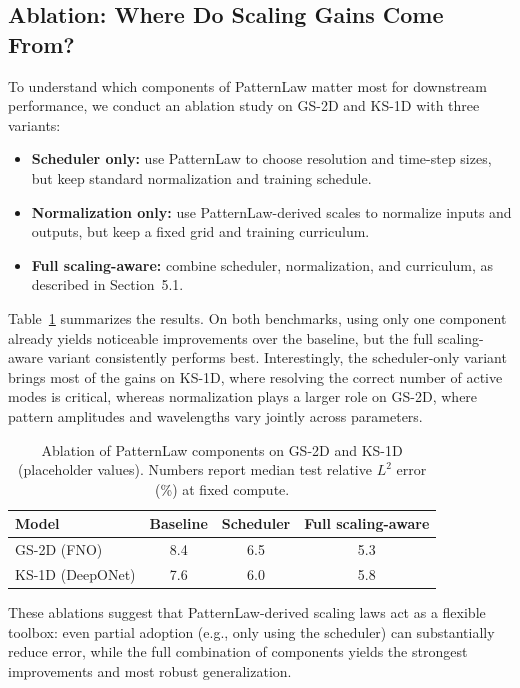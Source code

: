 \documentclass{article}
\theoremstyle{plain}
\theoremstyle{definition}
\theoremstyle{remark}
\begin{document}
\subsection{Ablation: Where Do Scaling Gains Come From?}

To understand which components of PatternLaw matter most for downstream performance, we conduct an ablation study on GS-2D and KS-1D with three variants:

\begin{itemize}
    \item \textbf{Scheduler only:} use PatternLaw to choose resolution and time-step sizes, but keep standard normalization and training schedule.
    \item \textbf{Normalization only:} use PatternLaw-derived scales to normalize inputs and outputs, but keep a fixed grid and training curriculum.
    \item \textbf{Full scaling-aware:} combine scheduler, normalization, and curriculum, as described in Section~5.1.
\end{itemize}

Table~\ref{tab:ablation_scaling} summarizes the results. On both benchmarks, using only one component already yields noticeable improvements over the baseline, but the full scaling-aware variant consistently performs best. Interestingly, the scheduler-only variant brings most of the gains on KS-1D, where resolving the correct number of active modes is critical, whereas normalization plays a larger role on GS-2D, where pattern amplitudes and wavelengths vary jointly across parameters.

\begin{table}[t]
    \centering
    \caption{Ablation of PatternLaw components on GS-2D and KS-1D (placeholder values). Numbers report median test relative $L^2$ error (\%) at fixed compute.}
    \label{tab:ablation_scaling}
    \begin{tabular}{lccc}
        \toprule
        Model & Baseline & Scheduler & Full scaling-aware \\
        \midrule
        GS-2D (FNO) & 8.4 & 6.5 & 5.3 \\
        KS-1D (DeepONet) & 7.6 & 6.0 & 5.8 \\
        \bottomrule
    \end{tabular}
\end{table}

These ablations suggest that PatternLaw-derived scaling laws act as a flexible toolbox: even partial adoption (e.g., only using the scheduler) can substantially reduce error, while the full combination of components yields the strongest improvements and most robust generalization.
\end{document}
